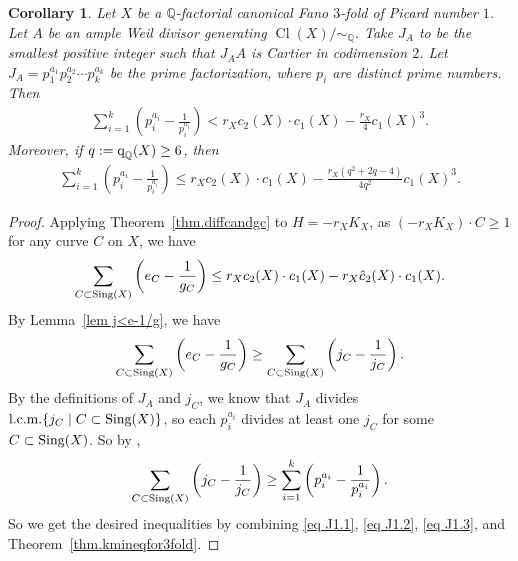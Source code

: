 \documentclass[12pt,twoside]{amsart}
\DeclareMathOperator{\Cl}{Cl}
\newcommand{\qQ}{\text{\rm q}_{\mathbb{Q}}}
\newcommand\lcm{{\text{l.c.m.}}}
\newtheorem{cor}[thm]{Corollary}
\theoremstyle{definition}
\begin{document}
\begin{cor}\label{cor.rangeofJ}
 Let $X$ be a $\mathbb Q$-factorial canonical Fano $3$-fold of Picard number $1$. Let $A$ be an ample Weil divisor generating $\Cl (X)/\sim_{\mathbb{Q}}$. Take $J_A$ to be the smallest positive integer such that $J_AA$ is Cartier in codimension $2$. Let $J_A=p_1^{a_1}p_2^{a_2}\cdots p_k^{a_k}$ be the prime factorization, where $p_i$ are distinct prime numbers. Then
 \begin{align}
 \sum_{i=1}^k\left(p_i^{a_i}-\frac{1}{p_i^{a_i}}\right)< r_Xc_2(X) \cdot c_1(X)- \frac{r_X}{4}c_1(X)^3.\label{eq upper J1}
 \end{align}
 Moreover, if $q:=\qQ(X)\geq 6$, then
 \begin{align}\sum_{i=1}^k\left(p_i^{a_i}-\frac{1}{p_i^{a_i}}\right)\leq r_Xc_2(X) \cdot c_1(X)- \frac{r_X(q^2+2q-4)}{4q^2}c_1(X)^3.\label{eq upper J2}
 \end{align}
\end{cor}

\begin{proof}
Applying Theorem~\ref{thm.diffcandgc} to $H=-r_XK_X$, as $(-r_XK_X)\cdot C\geq 1$ for any curve $C$ on $X$, 
we have 
\begin{align}
 \sum_{C\subset \text{\rm Sing}(X)}\left(e_C-\frac{1}{g_C}\right) \leq %
 r_Xc_2(X) \cdot c_1(X)-r_X\hat c_2(X) \cdot c_1(X). \label{eq J1.1}
\end{align}
 By Lemma~\ref{lem j<e-1/g}, we have 
\begin{align} \sum_{C\subset \text{\rm Sing}(X)}\left(e_C-\frac{1}{g_C}\right)\geq \sum_{C\subset \text{\rm Sing}(X)}\left(j_C-\frac{1}{j_C}\right).
\label{eq J1.2}
\end{align}
By the definitions of $J_A$ and $j_C$, we know that $J_A$ divides $\lcm\{j_C\mid C\subset \text{\rm Sing}(X)\}$, so each $p_i^{a_i}$ divides at least one $j_C$ for some $C\subset \text{\rm Sing}(X)$. So by \cite[Page~65, (2.2)]{ChenJiang2016}, 
\begin{align}
 \sum_{C\subset \text{\rm Sing}(X)}\left(j_C-\frac{1}{j_C}\right)\geq \sum_{i=1}^k\left(p_i^{a_i}-\frac{1}{p_i^{a_i}}\right).\label{eq J1.3}
\end{align}
So we get the desired inequalities by combining \eqref{eq J1.1}, \eqref{eq J1.2}, \eqref{eq J1.3}, and Theorem~\ref{thm.kmineqfor3fold}. 
\end{proof}
\end{document}
